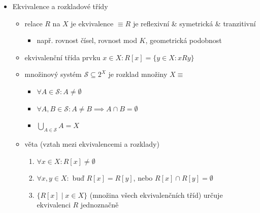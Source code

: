 \begin{itemize}
\begin{itemize}
\begin{itemize}
\begin{itemize}
\end{itemize}
\item symetrická $\equiv \forall x,y \in X: xRy \implies yRx$
\begin{itemize}
\item $R=R^{-1}$
\end{itemize}
\item antisymetrická $\equiv \forall x,y \in X: xRy \land yRx \implies x=y$
\begin{itemize}
\item $R\cap R^{-1}\subseteq \Delta_X$
\end{itemize}
\item tranzitivní $\equiv \forall x,y,z \in X: xRy \land yRz \implies xRz$
\begin{itemize}
\item $R\circ R \subseteq R$
\end{itemize}
\end{itemize}
\end{itemize}
\item Ekvivalence a rozkladové třídy
\begin{itemize}
\item relace $R$ na $X$ je ekvivalence $\equiv R$ je reflexivní \& symetrická \& tranzitivní
\begin{itemize}
\item např. rovnost čísel, rovnost mod $K$, geometrická podobnost
\end{itemize}
\item ekvivalenční třída prvku $x \in X:R[x]=\lbrace y \in X : xRy\rbrace$
\item množinový systém $\mathcal S\subseteq 2^X$ je rozklad množiny $X \equiv$
\begin{itemize}
\item $\forall A \in \mathcal S: A \neq \emptyset$
\item $\forall A,B\in \mathcal S: A\neq B \implies A \cap B = \emptyset$
\item $\bigcup_{A\in \mathcal S}A=X$
\end{itemize}
\item věta (vztah mezi ekvivalencemi a rozklady)
\begin{enumerate}
\item $\forall x \in X: R[x]\neq \emptyset$
\item $\forall x,y \in X:$ buď $R[x]=R[y]$, nebo $R[x] \cap R[y]=\emptyset$
\item $\lbrace R[x] \mid x \in X\rbrace$ (množina všech ekvivalenčních tříd) určuje ekvivalenci $R$ jednoznačně

\end{enumerate}
\end{itemize}
\end{itemize}
